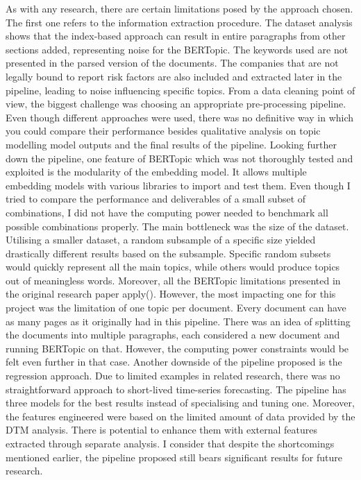\documentclass[12pt,MSc,a4paper,oneside]{muthesis}
\begin{document}
As with any research, there are certain limitations posed by the approach chosen. 
The first one refers to the information extraction procedure. The dataset analysis shows that the index-based approach can result in entire paragraphs from other sections added, representing noise for the BERTopic. The keywords used are not presented in the parsed version of the documents. The companies that are not legally bound to report risk factors are also included and extracted later in the pipeline, leading to noise influencing specific topics. 
From a data cleaning point of view, the biggest challenge was choosing an appropriate pre-processing pipeline. Even though different approaches were used, there was no definitive way in which you could compare their performance besides qualitative analysis on topic modelling model outputs and the final results of the pipeline. 
Looking further down the pipeline, one feature of BERTopic which was not thoroughly tested and exploited is the modularity of the embedding model. It allows multiple embedding models with various libraries to import and test them. Even though I tried to compare the performance and deliverables of a small subset of combinations, I did not have the computing power needed to benchmark all possible combinations properly. The main bottleneck was the size of the dataset. Utilising a smaller dataset, a random subsample of a specific size yielded drastically different results based on the subsample. Specific random subsets would quickly represent all the main topics, while others would produce topics out of meaningless words.
Moreover, all the BERTopic limitations presented in the original research paper apply(\cite{bertopic-latest-paper}). However, the most impacting one for this project was the limitation of one topic per document. Every document can have as many pages as it originally had in this pipeline. There was an idea of splitting the documents into multiple paragraphs, each considered a new document and running BERTopic on that. However, the computing power constraints would be felt even further in that case.
Another downside of the pipeline proposed is the regression approach. Due to limited examples in related research, there was no straightforward approach to short-lived time-series forecasting. The pipeline has three models for the best results instead of specialising and tuning one. Moreover, the features engineered were based on the limited amount of data provided by the DTM analysis. There is potential to enhance them with external features extracted through separate analysis.
I consider that despite the shortcomings mentioned earlier, the pipeline proposed still bears significant results for future research.
\end{document}

